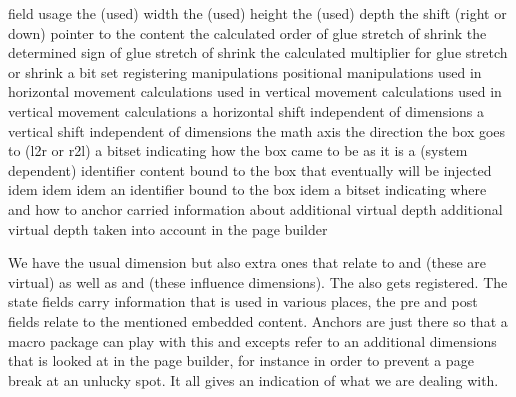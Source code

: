 \starttabulate
\FL
\BC field                 \BC usage \NC \NR
\TL
\NC {}         \NC the (used) width \NC \NR
\NC {}        \NC the (used) height \NC \NR
\NC {}         \NC the (used) depth \NC \NR
\NC {}  \NC the shift (right or down) \NC \NR
\ML
\NC {}          \NC pointer to the content \NC \NR
\ML
\NC {}    \NC the calculated order of glue stretch of shrink \NC \NR
\NC {}     \NC the determined sign of glue stretch of shrink \NC \NR
\NC {}      \NC the calculated multiplier for glue stretch or shrink \NC \NR
\ML
\NC {}      \NC a bit set registering manipulations \NC \NR
\NC {}   \NC positional manipulations \NC \NR
\NC {}      \NC used in horizontal movement calculations \NC \NR
\NC {}      \NC used in vertical movement calculations \NC \NR
\NC {}      \NC used in vertical movement calculations \NC \NR
\NC {}      \NC a horizontal shift independent of dimensions \NC \NR
\NC {}      \NC a vertical shift independent of dimensions  \NC \NR
\NC {}          \NC the math axis \NC \NR
\ML
\NC {}           \NC the direction the box goes to (l2r or r2l) \NC \NR
\NC {} \NC a bitset indicating how the box came to be as it is \NC \NR
\NC {}         \NC a (system dependent) identifier \NC \NR
\ML
\NC {}  \NC content bound to the box that eventually will be injected \NC \NR
\NC {} \NC idem \NC \NR
\NC {}  \NC idem \NC \NR
\NC {} \NC idem \NC \NR
\ML
\NC {} \NC an identifier bound to the box \NC \NR
\NC {} \NC idem \NC \NR
\NC {}        \NC a bitset indicating where and how to anchor \NC \NR
\ML
\NC {}        \NC carried information about additional virtual depth \NC \NR
\NC {}       \NC additional virtual depth taken into account in the page builder \NC \NR
\LL
\stoptabulate

We have the usual dimension but also extra ones that relate to \typ {\boxxoffset}
and \typ {\boxyoffset} (these are virtual) as well as \typ {\boxxmove} and \typ
{\boxymove} (these influence dimensions). The \typ {\boxorientation} also gets
registered. The state fields carry information that is used in various places,
the pre and post fields relate to the mentioned embedded content. Anchors are
just there so that a macro package can play with this and excepts refer to an
additional dimensions that is looked at in the page builder, for instance in
order to prevent a page break at an unlucky spot. It all gives an indication of
what we are dealing with.

